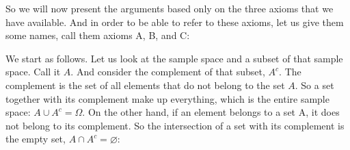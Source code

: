 \documentclass[pdftex, brazil, 12pt, twoside]{article}
\begin{document}
\begin{figure}[H]
  \begin{center}
  \end{center}
\end{figure}

So we will now present the arguments based only on the
three axioms that we have available.
And in order to be able to refer to these axioms, let us
give them some names, call them axioms A, B, and C:

\begin{figure}[H]
  \begin{center}
  \end{center}
\end{figure}

We start as follows.
Let us look at the sample space and a subset of that
sample space.
Call it $A$. And consider the complement of that subset, $A^c$.
The complement is the set of all elements that do not
belong to the set $A$. So a set together with its complement
make up everything, which is the entire sample space: $A \cup A^c = \Omega$.
On the other hand, if an element belongs to a set A, it
does not belong to its complement.
So the intersection of a set with its complement
is the empty set, $A \cap A^c = \varnothing$:
\end{document}

